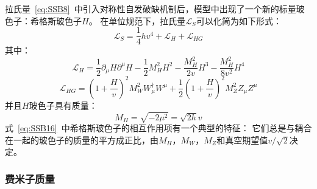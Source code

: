 拉氏量~\ref{eq:SSB8}~中引入对称性自发破缺机制后，模型中出现了一个新的标量玻色子：希格斯玻色子$H$。
在单位规范下，拉氏量$\mathcal{L}_S$可以化简为如下形式：
\begin{equation} 
\label{eq:SSB14}
\mathcal{L}_S=\frac{1}{4}hv^4+\mathcal{L}_H+\mathcal{L}_{HG}
\end{equation}
其中：
\begin{equation} 
\label{eq:SSB15}
\mathcal{L}_H=\frac{1}{2}\partial_{\mu}H\partial^{\mu}H -\frac{1}{2}M_H^2 H^2
-\frac{M_H^2 }{2v}H^3 -\frac{M_H^2 }{8v^2}H^4
\end{equation}
\begin{equation} 
\label{eq:SSB16}
\mathcal{L}_{HG}= \left( 1+\frac{H}{v} \right)^2 M_W^2 W^{\dagger}_{\mu}W^{\mu} 
+ \frac{1}{2} \left( 1+\frac{H}{v} \right)^2 M_Z^2 Z_{\mu}Z^{\mu} 
\end{equation}
并且$H$玻色子具有质量：
\begin{equation} 
\label{eq:SSB17}
M_H=\sqrt{-2\mu^2}=\sqrt{2h}v
\end{equation}
式~\ref{eq:SSB16}~中希格斯玻色子的相互作用项有一个典型的特征：
它们总是与耦合在一起的玻色子的质量的平方成正比，由$M_H$，$M_W$，$M_Z$和真空期望值$v/\sqrt{2}$决定。


\subsubsection{费米子质量}
\label{sec:SSBF}

